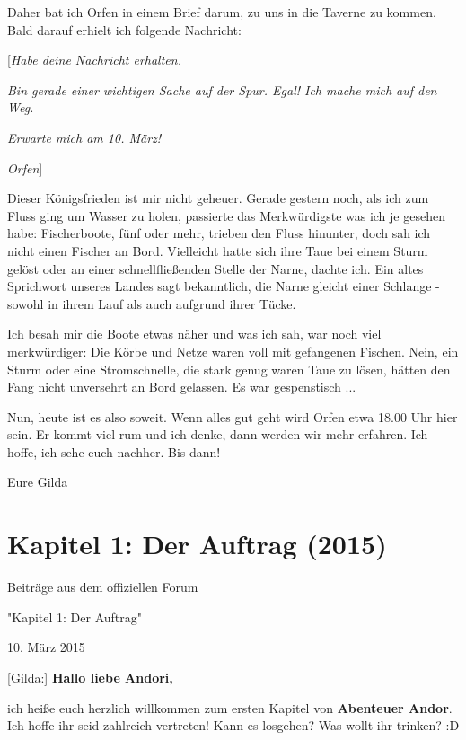 \documentclass[10pt, a4paper, oneside]{book}
\newcommand{\fillbreak}{\vspace*{\fill}\columnbreak}
\newcommand{\storytext}[1]{%
    \section{#1}%
    \label{Storytext: #1}%
}
\newcommand{\bildmitts}[2][height=0.32\textwidth,width=0.48\textwidth,keepaspectratio]{%
    \begin{center}
        \texttt{[image: Chronik der Andorversen/Bilder/\#2]}
    \end{center}
}
\begin{document}
\begin{multicols}{2}
Daher bat ich Orfen in einem Brief darum, zu uns in die Taverne zu kommen. Bald darauf erhielt ich folgende Nachricht:


[\textit{Habe deine Nachricht erhalten.}

\textit{Bin gerade einer wichtigen Sache auf der Spur. Egal! Ich mache mich auf den Weg.}

\textit{Erwarte mich am 10. März!}

\textit{Orfen}]

Dieser Königsfrieden ist mir nicht geheuer. Gerade gestern noch, als ich zum Fluss ging um Wasser zu holen, passierte das Merkwürdigste was ich je gesehen habe: Fischerboote, fünf oder mehr, trieben den Fluss hinunter, doch sah ich nicht einen Fischer an Bord. Vielleicht hatte sich ihre Taue bei einem Sturm gelöst oder an einer schnellfließenden Stelle der Narne, dachte ich. Ein altes Sprichwort unseres Landes sagt bekanntlich, die Narne gleicht einer Schlange - sowohl in ihrem Lauf als auch aufgrund ihrer Tücke.


Ich besah mir die Boote etwas näher und was ich sah, war noch viel merkwürdiger: Die Körbe und Netze waren voll mit gefangenen Fischen. Nein, ein Sturm oder eine Stromschnelle, die stark genug waren Taue zu lösen, hätten den Fang nicht unversehrt an Bord gelassen. Es war gespenstisch ...

Nun, heute ist es also soweit. Wenn alles gut geht wird Orfen etwa 18.00 Uhr hier sein. Er kommt viel rum und ich denke, dann werden wir mehr erfahren. Ich hoffe, ich sehe euch nachher. Bis dann!

Eure Gilda



\fillbreak
\storytext{Kapitel 1: Der Auftrag (2015)}

\begin{center}
    Beiträge aus dem offiziellen Forum

    "Kapitel 1: Der Auftrag"

    10. März 2015
\end{center}



[Gilda:] \textbf{Hallo liebe Andori,}

ich heiße euch herzlich willkommen zum ersten Kapitel von \textbf{Abenteuer Andor}. Ich hoffe ihr seid zahlreich vertreten! Kann es losgehen? Was wollt ihr trinken? :D


\end{multicols}
\end{document}
